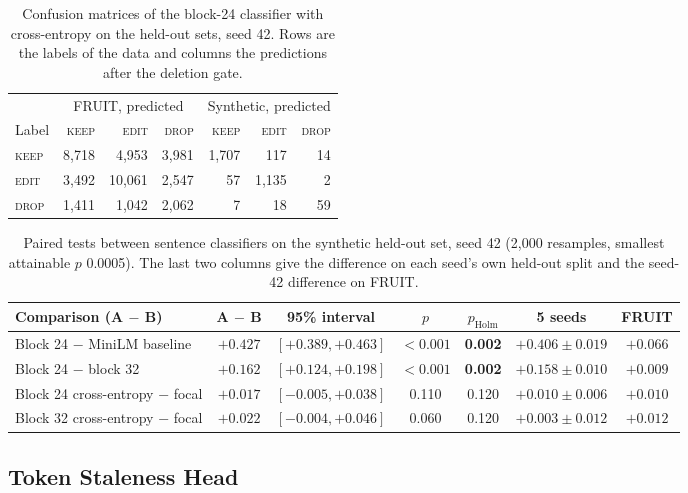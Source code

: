 \documentclass[]{paper}
\newcommand{\keep}{\textsc{keep}}
\newcommand{\edit}{\textsc{edit}}
\newcommand{\drop}{\textsc{drop}}
\begin{document}
\begin{table}[H]
\caption{Confusion matrices of the block-24 classifier with cross-entropy on the held-out sets, seed 42. Rows are the labels of the data and columns the predictions after the deletion gate.}
\label{tab:confusion}
\centering
\footnotesize
\begin{tabular}{lrrrrrr}
\toprule
 & \multicolumn{3}{c}{FRUIT, predicted} & \multicolumn{3}{c}{Synthetic, predicted} \\
Label & \keep{} & \edit{} & \drop{} & \keep{} & \edit{} & \drop{} \\
\midrule
\keep{} & 8,718 & 4,953 & 3,981 & 1,707 & 117 & 14 \\
\edit{} & 3,492 & 10,061 & 2,547 & 57 & 1,135 & 2 \\
\drop{} & 1,411 & 1,042 & 2,062 & 7 & 18 & 59 \\
\bottomrule
\end{tabular}
\end{table}

\begin{table}[H]
\caption{Paired tests between sentence classifiers on the synthetic held-out set, seed 42 (2,000 resamples, smallest attainable $p$ 0.0005). The last two columns give the difference on each seed's own held-out split and the seed-42 difference on FRUIT.}
\label{tab:classifier_tests}
\centering
\footnotesize
\setlength{\tabcolsep}{4pt}
\begin{tabular}{lcccccc}
\toprule
Comparison (A $-$ B) & A $-$ B & 95\% interval & $p$ & $p_{\text{Holm}}$ & 5 seeds & FRUIT \\
\midrule
Block 24 $-$ MiniLM baseline & $+0.427$ & $[+0.389, +0.463]$ & $<0.001$ & \textbf{0.002} & $+0.406 \pm 0.019$ & $+0.066$ \\
Block 24 $-$ block 32 & $+0.162$ & $[+0.124, +0.198]$ & $<0.001$ & \textbf{0.002} & $+0.158 \pm 0.010$ & $+0.009$ \\
Block 24 cross-entropy $-$ focal & $+0.017$ & $[-0.005, +0.038]$ & 0.110 & 0.120 & $+0.010 \pm 0.006$ & $+0.010$ \\
Block 32 cross-entropy $-$ focal & $+0.022$ & $[-0.004, +0.046]$ & 0.060 & 0.120 & $+0.003 \pm 0.012$ & $+0.012$ \\
\bottomrule
\end{tabular}
\end{table}

\subsection{Token Staleness Head}
\end{document}
